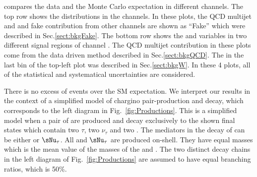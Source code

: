 compares the data and the Monte Carlo expectation in different channels. The top row 
shows the \mttwo distributions in the \leptonTau channels. 
In these plots, the QCD multijet and \wjets and fake contribution from other channels are shown 
as ``Fake'' which were described in Sec.\ref{sect:bkgFake}.
The bottom row shows the \mttwo and \SumMT variables in two different signal regions of \tauTau channel . 
The QCD multijet contribution in these plots come from the data driven method described in 
Sec.\ref{sect:bkgQCD}. The \wjets in the last bin of the top-left plot was described in Sec.\ref{sect:bkgW}. 
In these 4 plots, all of the statistical and systematical uncertainties are considered.

There is no excess of events over the SM expectation.  We interpret our results in the context
of a simplified model of chargino pair-production and decay, which corresponds to the left
diagram in Fig.~\ref{fig:Productions}. This is a simplified model when a pair of \chione 
are produced and decay exclusively to the shown final states which contain two $\tau$, two $\nu_{\tau}$ and two \PSGczDo.
The mediators in the decay of \chione can be either \sTau or $\sNu_{\tau}$. All  \sTau and $\sNu_{\tau}$ 
are produced  on-shell. They have equal masses which is the mean value of the masses of the \chione   and \PSGczDo.
The two distinct decay chains in the left diagram of Fig.~\ref{fig:Productions} are assumed to have equal branching ratios, which is 50\%.



